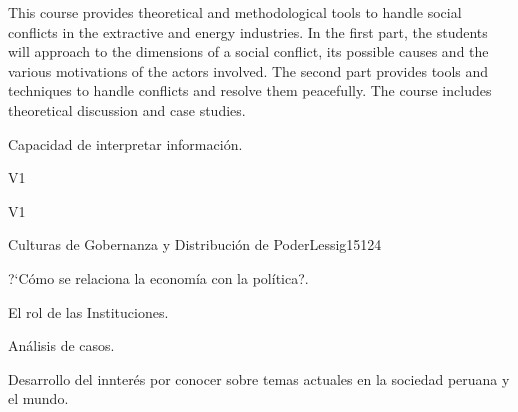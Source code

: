 \begin{syllabus}


\begin{justification}
This course provides theoretical and methodological tools to handle social conflicts in the extractive and energy industries. In the first part, the students will approach to the dimensions of a social conflict, its possible causes and the various motivations of the actors involved. The second part provides tools and techniques to handle conflicts and resolve them peacefully. The course includes theoretical discussion and case studies.

\end{justification}

\begin{goals}
\item Capacidad de interpretar información.
\end{goals}

\begin{outcomes}{V1}
    \item {}
    \item {}
    \item {}
    
\end{outcomes}

\begin{competences}{V1}
    \item {}
    \item {}
    \item {}
    \item {}
\end{competences}

\begin{unit}{Culturas de Gobernanza y Distribución de Poder}{}{Lessig15}{12}{4}
   \begin{topics}
      \item ?`Cómo se relaciona la economía con la política?.
      \item El rol de las Instituciones.
      \item Análisis de casos.
   \end{topics}
   \begin{learningoutcomes}
      \item Desarrollo del innterés por conocer sobre temas actuales en la sociedad peruana y el mundo.
   \end{learningoutcomes}
\end{unit}

\begin{coursebibliography}
\end{coursebibliography}

\end{syllabus}
